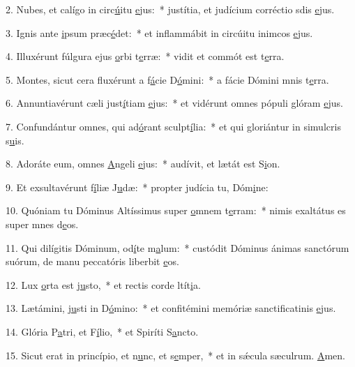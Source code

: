 2. Nubes, et calígo in circ\uline{ú}itu \uline{e}jus:~* justítia, et judícium corréctio sdis \uline{e}jus.\par 
3. Ignis ante \uline{i}psum præc\uline{é}det:~* et inflammábit in circúitu inimcos \uline{e}jus.\par 
4. Illuxérunt fúlgura ejus \uline{o}rbi t\uline{e}rræ:~* vidit et commót est t\uline{e}rra.\par 
5. Montes, sicut cera fluxérunt a f\uline{á}cie D\uline{ó}mini:~* a fácie Dómini mnis t\uline{e}rra.\par 
6. Annuntiavérunt cæli just\uline{í}tiam \uline{e}jus:~* et vidérunt omnes pópuli glóram \uline{e}jus.\par 
7. Confundántur omnes, qui ad\uline{ó}rant sculpt\uline{í}lia:~* et qui gloriántur in simulcris s\uline{u}is.\par 
8. Adoráte eum, omnes \uline{A}ngeli \uline{e}jus:~* audívit, et lætát est S\uline{i}on.\par 
9. Et exsultavérunt f\uline{í}liæ J\uline{u}dæ:~* propter judícia tu, Dóm\uline{i}ne:\par 
10. Quóniam tu Dóminus Altíssimus super \uline{o}mnem t\uline{e}rram:~* nimis exaltátus es super mnes d\uline{e}os.\par 
11. Qui dilígitis Dóminum, od\uline{í}te m\uline{a}lum:~* custódit Dóminus ánimas sanctórum suórum, de manu peccatóris liberbit \uline{e}os.\par 
12. Lux \uline{o}rta est j\uline{u}sto,~* et rectis corde ltít\uline{i}a.\par 
13. Lætámini, j\uline{u}sti in D\uline{ó}mino:~* et confitémini memóriæ sanctificatinis \uline{e}jus.\par 
14. Glória P\uline{a}tri, et F\uline{í}lio,~* et Spiríti S\uline{a}ncto.\par 
15. Sicut erat in princípio, et n\uline{u}nc, et s\uline{e}mper,~* et in sǽcula sæculrum. \uline{A}men.\par 
